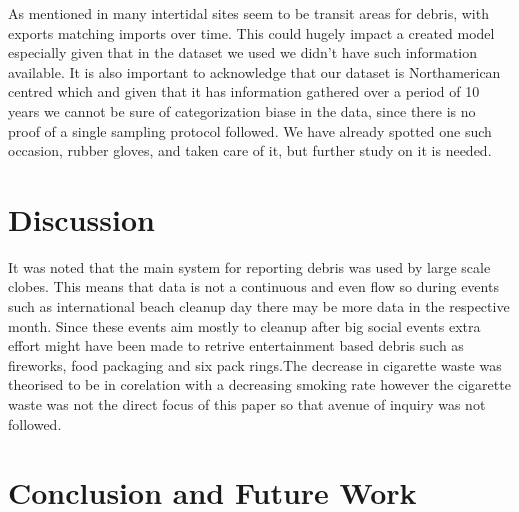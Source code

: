 \documentclass[10pt]{article}\usepackage[]{graphicx}\usepackage[]{color}
\begin{document}
As mentioned in \cite{BROWNE2015} many intertidal sites seem to be transit areas for debris, with exports matching imports over
time. This could hugely impact a created model especially given that in the dataset we used we didn't have such information available. It is also important to acknowledge that our dataset is Northamerican centred which and given that it has information gathered over a period of 10 years we cannot be sure of categorization biase in the data, since there is no proof of a single sampling protocol followed. We have already spotted one such occasion, rubber gloves, and taken care of it, but further study on it is needed.



\pagebreak
\section{Discussion}

It was noted that the main system for reporting debris was used by large scale clobes. This means that data is not a continuous and even flow so during events such as international beach cleanup day there may be more data in the respective month. Since these events aim mostly to cleanup after big social events extra effort might have been made to retrive entertainment based debris such as fireworks, food packaging and six pack rings.The decrease in cigarette waste was theorised to be in corelation with a decreasing smoking rate however the cigarette waste was not the direct focus of this paper so that avenue of inquiry was not followed.






\section{Conclusion and Future Work}\label{cdsmote1}
\end{document}
